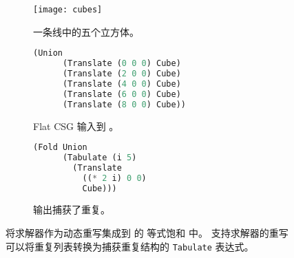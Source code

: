 \begin{figure}
\begin{subfigure}[b]{0.3\linewidth}
  \texttt{[image: cubes]}
  \caption{一条线中的五个立方体。}
\end{subfigure}
\hfill
\begin{subfigure}[b]{0.3\linewidth}
  \begin{lstlisting}[language=Rust, gobble=4, basicstyle=\footnotesize\ttfamily]
    (Union
      (Translate (0 0 0) Cube)
      (Translate (2 0 0) Cube)
      (Translate (4 0 0) Cube)
      (Translate (6 0 0) Cube)
      (Translate (8 0 0) Cube))
  \end{lstlisting}
  \caption{Flat CSG 输入到 \sz。}
  \label{fig:sz-egg-input}
\end{subfigure}
\hfill
\begin{subfigure}[b]{0.35\linewidth}
  \begin{lstlisting}[language=Rust, gobble=4, basicstyle=\footnotesize\ttfamily, showlines=true, xleftmargin=5mm]
    (Fold Union
      (Tabulate (i 5)
        (Translate
          ((* 2 i) 0 0)
          Cube)))

  \end{lstlisting}
  \caption{输出捕获了重复。}
  \label{fig:sz-egg-output}
\end{subfigure}
  \caption{
    \sz 将求解器作为动态重写集成到 \egg 的 等式饱和 中。
    支持求解器的重写可以将重复列表转换为捕获重复结构的 \texttt{Tabulate} 表达式。%
  }
  \label{fig:sz-egg}
\end{figure}


